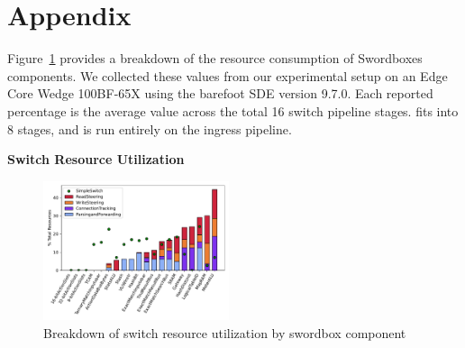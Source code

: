 \section{Appendix}

Figure~\ref{fig:switch_resources} provides a breakdown of the resource
consumption of Swordboxes components. We collected these values from our
experimental setup on an Edge Core Wedge 100BF-65X using the barefoot SDE
version 9.7.0. Each reported percentage is the average value across the total 16
switch pipeline stages. {\sword} fits into 8 stages, and is run entirely on the
ingress pipeline.

\textbf{Switch Resource Utilization}
\begin{figure}[t]
    \includegraphics[width=0.485\textwidth]{fig/switch_resources.pdf}
    \caption{Breakdown of switch resource utilization by swordbox component}
    \label{fig:switch_resources}
\end{figure}